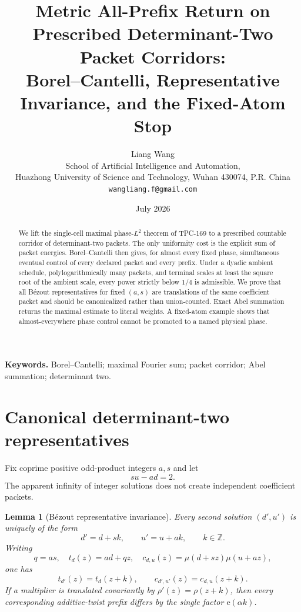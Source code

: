 \documentclass[11pt]{article}
\title{\textbf{Metric All-Prefix Return on Prescribed
Determinant-Two Packet Corridors:\\
Borel--Cantelli, Representative Invariance, and the Fixed-Atom Stop}}
\author{Liang Wang\\
\small School of Artificial Intelligence and Automation,\\[-2pt]
\small Huazhong University of Science and Technology, Wuhan 430074, P.R. China\\
\small \texttt{wangliang.f@gmail.com}}
\date{July 2026}
\newtheorem{lemma}[theorem]{Lemma}
\theoremstyle{definition}
\newcommand{\e}{\mathrm e}
\begin{document}
\maketitle

\begin{abstract}
We lift the single-cell maximal phase-\(L^2\) theorem of TPC-169 to
a prescribed countable corridor of determinant-two packets.  The
only uniformity cost is the explicit sum of packet energies.
Borel--Cantelli then gives, for almost every fixed phase, simultaneous
eventual control of every declared packet and every prefix.  Under a
dyadic ambient schedule, polylogarithmically many packets, and
terminal scales at least the square root of the ambient scale, every
power strictly below \(1/4\) is admissible.  We prove that all
B\'ezout representatives for fixed \((a,s)\) are translations of the
same coefficient packet and should be canonicalized rather than
union-counted.  Exact Abel summation returns the maximal estimate to
literal weights.  A fixed-atom example shows that almost-everywhere
phase control cannot be promoted to a named physical phase.
\end{abstract}

\noindent\textbf{Keywords.}
Borel--Cantelli; maximal Fourier sum; packet corridor; Abel
summation; determinant two.

\medskip
\noindent{}

\section{Canonical determinant-two representatives}

Fix coprime positive odd-product integers \(a,s\) and let
\[
 su-ad=2.
\]
The apparent infinity of integer solutions does not create
independent coefficient packets.

\begin{lemma}[B\'ezout representative invariance]\label{lem:translate}
Every second solution \((d',u')\) is uniquely of the form
\begin{equation}
 d'=d+sk,\qquad u'=u+ak,\qquad k\in\mathbb Z.
\label{eq:representative}
\end{equation}
Writing
\[
 q=as,\quad t_{d}(z)=ad+qz,\quad
 c_{d,u}(z)=\mu(d+sz)\mu(u+az),
\]
one has
\begin{equation}
 t_{d'}(z)=t_d(z+k),\qquad
 c_{d',u'}(z)=c_{d,u}(z+k).
\label{eq:translation}
\end{equation}
If a multiplier is translated covariantly by
\(\rho'(z)=\rho(z+k)\), then every corresponding additive-twist
prefix differs by the single factor \(\e(\alpha k)\).
\end{lemma}
\end{document}
